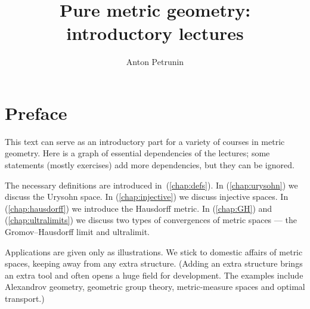 \documentclass[twoside]{book}
\begin{document}

 
\title{Pure metric geometry:\\
introductory lectures}
\author{Anton Petrunin}
\date{}
\maketitle

\section*{Preface}

This text can serve as an introductory part for a variety of courses in metric geometry.
Here is a graph of essential dependencies of the lectures; some statements (mostly exercises) add more dependencies, but they can be ignored.
\begin{figure}[!ht]
\centering
{}
\end{figure}
The necessary definitions are introduced in~(\ref{chap:defs}).
In (\ref{chap:urysohn}) we discuss the Urysohn space.
In (\ref{chap:injective}) we discuss injective spaces.
In (\ref{chap:hausdorff}) we introduce the Hausdorff metric.
In (\ref{chap:GH}) and (\ref{chap:ultralimits}) we discuss two types of convergences of metric spaces --- the Gromov--Hausdorff limit and ultralimit.

Applications are given only as illustrations.
We stick to domestic affairs of metric spaces, keeping away from any extra structure. 
(Adding an extra structure brings an extra tool and often opens a huge field for development.
The examples include Alexandrov geometry,
geometric group theory,
metric-measure spaces and optimal transport.)
\end{document}
